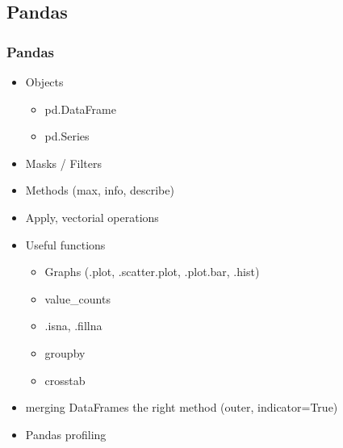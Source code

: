 \subsection{Pandas}

\begin{frame}\frametitle{Pandas}
   \begin{itemize}
      \item Objects
      \begin{itemize}
         \item pd.DataFrame
         \item pd.Series
      \end{itemize}
      \item Masks / Filters
      \item Methods (max, info, describe)
      \item Apply, vectorial operations
      \item Useful functions
      \begin{itemize}
         \item Graphs (.plot, .scatter.plot, .plot.bar, .hist)
         \item value\_counts
         \item .isna, .fillna
         \item groupby
         \item crosstab
      \end{itemize}
      \item merging DataFrames the right method (outer, indicator=True)
      \item Pandas profiling
   \end{itemize}
\end{frame}


